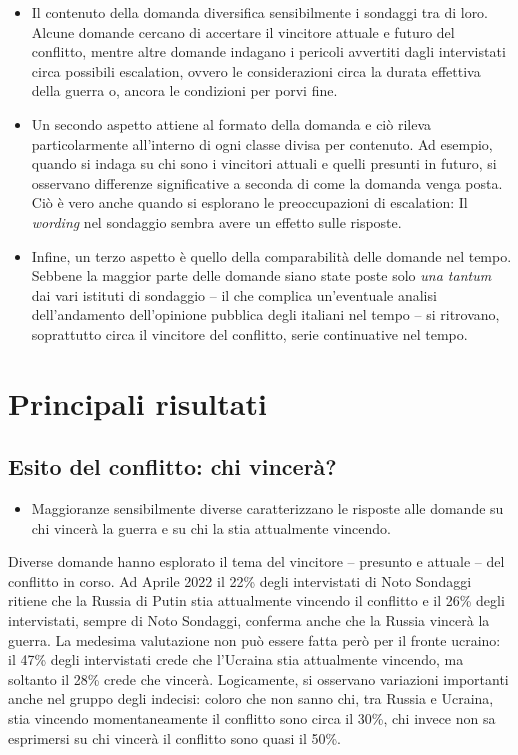 \documentclass[
]{book}
\providecommand{\tightlist}{%
  \setlength{\itemsep}{0pt}\setlength{\parskip}{0pt}}
\begin{document}
\begin{itemize}
\item
  Il contenuto della domanda diversifica sensibilmente i sondaggi tra di loro. Alcune domande cercano di accertare il vincitore attuale e futuro del conflitto, mentre altre domande indagano i pericoli avvertiti dagli intervistati circa possibili escalation, ovvero le considerazioni circa la durata effettiva della guerra o, ancora le condizioni per porvi fine.
\item
  Un secondo aspetto attiene al formato della domanda e ciò rileva particolarmente all'interno di ogni classe divisa per contenuto. Ad esempio, quando si indaga su chi sono i vincitori attuali e quelli presunti in futuro, si osservano differenze significative a seconda di come la domanda venga posta. Ciò è vero anche quando si esplorano le preoccupazioni di escalation: Il \emph{wording} nel sondaggio sembra avere un effetto sulle risposte.
\item
  Infine, un terzo aspetto è quello della comparabilità delle domande nel tempo. Sebbene la maggior parte delle domande siano state poste solo \emph{una tantum} dai vari istituti di sondaggio -- il che complica un'eventuale analisi dell'andamento dell'opinione pubblica degli italiani nel tempo -- si ritrovano, soprattutto circa il vincitore del conflitto, serie continuative nel tempo.
\end{itemize}

\hypertarget{principali-risultati-2}{%
\section{Principali risultati}\label{principali-risultati-2}}

\hypertarget{esito-del-conflitto-chi-vinceruxe0}{%
\subsection{Esito del conflitto: chi vincerà?}\label{esito-del-conflitto-chi-vinceruxe0}}

\begin{itemize}
\tightlist
\item
  Maggioranze sensibilmente diverse caratterizzano le risposte alle domande su chi vincerà la guerra e su chi la stia attualmente vincendo.
\end{itemize}

Diverse domande hanno esplorato il tema del vincitore -- presunto e attuale -- del conflitto in corso. Ad Aprile 2022 il 22\% degli intervistati di Noto Sondaggi ritiene che la Russia di Putin stia attualmente vincendo il conflitto e il 26\% degli intervistati, sempre di Noto Sondaggi, conferma anche che la Russia vincerà la guerra. La medesima valutazione non può essere fatta però per il fronte ucraino: il 47\% degli intervistati crede che l'Ucraina stia attualmente vincendo, ma soltanto il 28\% crede che vincerà. Logicamente, si osservano variazioni importanti anche nel gruppo degli indecisi: coloro che non sanno chi, tra Russia e Ucraina, stia vincendo momentaneamente il conflitto sono circa il 30\%, chi invece non sa esprimersi su chi vincerà il conflitto sono quasi il 50\%.
\end{document}
